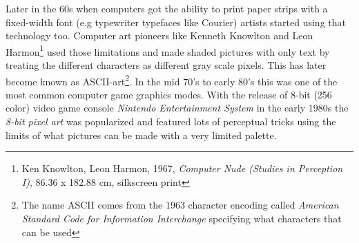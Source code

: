 \documentclass{article}
\begin{document}
Later in the 60s when computers got the ability to print paper strips with a fixed-width
font (e.g typewriter typefaces like Courier) artists started using that technology too.
Computer art pioneers like Kenneth Knowlton and Leon Harmon\footnote{Ken Knowlton, Leon Harmon,
  1967, \emph{Computer Nude (Studies in Perception I)}, 86.36 x 182.88
  cm, silkscreen print} used those limitations and made shaded pictures
with only text by treating the different characters as different gray
scale pixels. This has later become known as ASCII-art\footnote{The name
  ASCII comes from the 1963 character encoding called \emph{American
  Standard Code for Information Interchange} specifying what characters
  that can be used}. In the mid 70's to early 80's this was one of the
most common computer game graphics modes. With the release of 8-bit (256
color) video game console \emph{Nintendo Entertainment System} in the
early 1980s the \emph{8-bit pixel art} was popularized and featured lots
of perceptual tricks using the limits of what pictures can be made with
a very limited palette.
\end{document}
